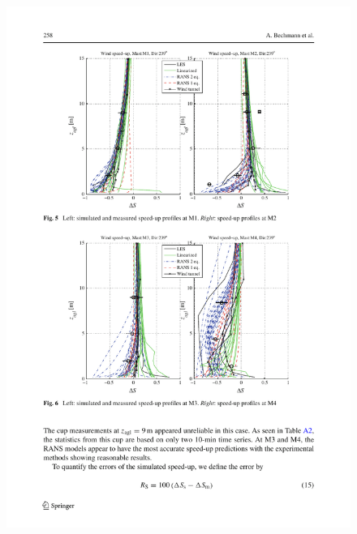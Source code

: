 \newpage
\vspace*{\fill}
\begin{figure}[H]
	\centering
	\includegraphics[width=1.0\linewidth,trim={2.7cm 14.4cm 1.9cm 2cm},clip]{bolund3.pdf}%
	

\end{figure}
